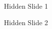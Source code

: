 \appendix

\begin{frame}
\end{frame}


\begin{frame}[plain]{Hidden Slide 1}
\end{frame}

\begin{frame}[plain]{Hidden Slide 2}
\end{frame}

